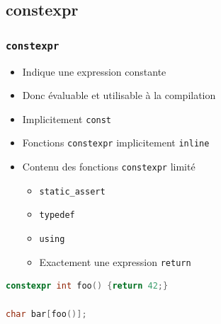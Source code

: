 \documentclass[C++.tex]{subfiles}
\begin{document}
\subsection*{constexpr}
\begin{frame}[fragile]
	\frametitle{\lstinline|constexpr|}
	\begin{itemize}
		\item Indique une expression constante
		\item Donc évaluable et utilisable à la compilation
		\item Implicitement \lstinline|const|
		\item Fonctions \lstinline|constexpr| implicitement \lstinline|inline|
		\item Contenu des fonctions \lstinline|constexpr| limité
		\begin{itemize}
			\item \lstinline|static_assert|
			\item \lstinline|typedef|
			\item \lstinline|using|
			\item Exactement une expression \lstinline|return|
		\end{itemize}

	\end{itemize}

	\begin{lstlisting}[language=C++]
constexpr int foo() {return 42;}

char bar[foo()];\end{lstlisting}
\end{frame}
\end{document}
